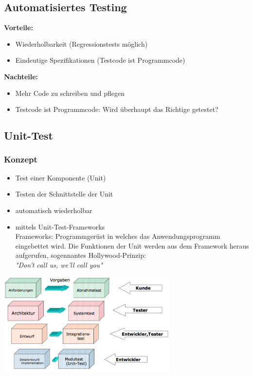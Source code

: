 \subsection{Automatisiertes Testing}
\textbf{Vorteile:}
\begin{itemize}
	\item Wiederholbarkeit (Regressionstests möglich)
	\item Eindeutige Spezifikationen (Testcode ist Programmcode)
\end{itemize}	
\textbf{Nachteile:}
\begin{itemize}
	\item Mehr Code zu schreiben und pflegen
	\item Testcode ist Programmcode: Wird überhaupt das Richtige getestet?
\end{itemize}

\subsection{Unit-Test}
\subsubsection{Konzept}
\begin{minipage}{10.5cm}
	\begin{itemize}
		\item Test einer Komponente (Unit)
		\item Testen der Schnittstelle der Unit
		\item automatisch wiederholbar
		\item mittels Unit-Test-Frameworks \\
		Frameworks: Programmgerüst in welches das Anwendungsprogramm eingebettet wird. Die Funktionen der Unit werden aus dem Framework heraus aufgerufen, sogennantes Hollywood-Prinzip:\\
		\textit{"{}Don't call us, we'll call you"}
	\end{itemize}
\end{minipage}
\begin{minipage}{9cm}
	\includegraphics[width=9cm]{images/wer_testet.png}
\end{minipage}

